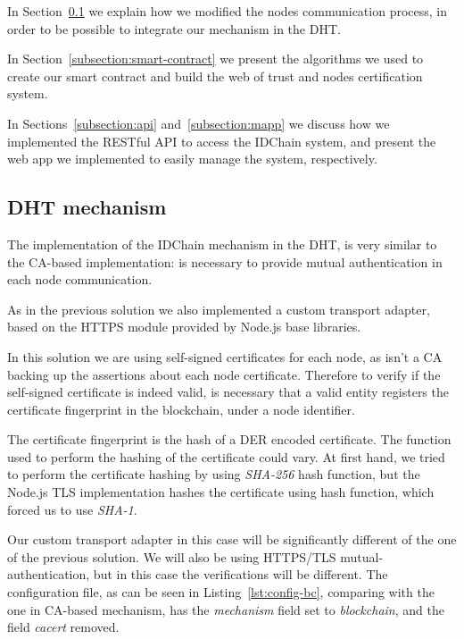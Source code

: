 In Section~\ref{subsection:dht-mechanism} we explain how we modified the nodes communication process, in order to be possible to integrate our mechanism in the DHT.

In Section~\ref{subsection:smart-contract} we present the algorithms we used to create our smart contract and build the web of trust and nodes certification system.

In Sections~\ref{subsection:api} and~\ref{subsection:mapp} we discuss how we implemented the RESTful API to access the IDChain system, and present the web app we implemented to easily manage the system, respectively.

\subsection{DHT mechanism}\label{subsection:dht-mechanism}

The implementation of the IDChain mechanism in the DHT, is very similar to the CA-based implementation: is necessary to provide mutual authentication in each node communication.

As in the previous solution we also implemented a custom transport adapter, based on the HTTPS module provided by Node.js base libraries.

In this solution we are using self-signed certificates for each node, as isn't a CA backing up the assertions about each node certificate.
Therefore to verify if the self-signed certificate is indeed valid, is necessary that a valid entity registers the certificate fingerprint in the blockchain, under a node identifier.

The certificate fingerprint is the hash of a \ac{DER} encoded certificate. The function used to perform the hashing of the certificate could vary.
At first hand, we tried to perform the certificate hashing by using \textit{SHA-256} hash function, but the Node.js TLS implementation hashes the certificate using  hash function, which forced us to use \textit{SHA-1}.

Our custom transport adapter in this case will be significantly different of the one of the previous solution.
We will also be using HTTPS/TLS mutual-authentication, but in this case the verifications will be different.
The configuration file, as can be seen in Listing~\ref{lst:config-bc}, comparing with the one in CA-based mechanism, has the \textit{mechanism} field set to \textit{blockchain}, and the field \textit{cacert} removed.



